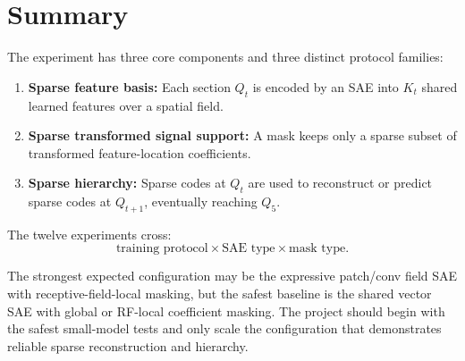 \documentclass[11pt]{article}
\begin{document}
\section{Summary}

The experiment has three core components and three distinct protocol families:

\begin{enumerate}[leftmargin=*]
    \item \textbf{Sparse feature basis:} Each section \(Q_t\) is encoded by an SAE into \(K_t\) shared learned features over a spatial field.
    \item \textbf{Sparse transformed signal support:} A mask keeps only a sparse subset of transformed feature-location coefficients.
    \item \textbf{Sparse hierarchy:} Sparse codes at \(Q_t\) are used to reconstruct or predict sparse codes at \(Q_{t+1}\), eventually reaching \(Q_5\).
\end{enumerate}

The twelve experiments cross:
\[
\text{training protocol}
\times
\text{SAE type}
\times
\text{mask type}.
\]

The strongest expected configuration may be the expressive patch/conv field SAE with receptive-field-local masking, but the safest baseline is the shared vector SAE with global or RF-local coefficient masking. The project should begin with the safest small-model tests and only scale the configuration that demonstrates reliable sparse reconstruction and hierarchy.
\end{document}
